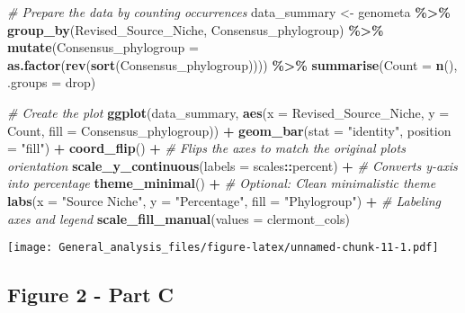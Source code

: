 \documentclass[
]{article}
\newenvironment{Shaded}{\begin{snugshade}}{\end{snugshade}}
\newcommand{\AttributeTok}[1]{\textcolor[rgb]{0.13,0.29,0.53}{#1}}
\newcommand{\CommentTok}[1]{\textcolor[rgb]{0.56,0.35,0.01}{\textit{#1}}}
\newcommand{\FunctionTok}[1]{\textcolor[rgb]{0.13,0.29,0.53}{\textbf{#1}}}
\newcommand{\NormalTok}[1]{#1}
\newcommand{\OtherTok}[1]{\textcolor[rgb]{0.56,0.35,0.01}{#1}}
\newcommand{\SpecialCharTok}[1]{\textcolor[rgb]{0.81,0.36,0.00}{\textbf{#1}}}
\newcommand{\StringTok}[1]{\textcolor[rgb]{0.31,0.60,0.02}{#1}}
\begin{document}
\begin{Shaded}
\begin{Highlighting}[]
\CommentTok{\# Prepare the data by counting occurrences}
\NormalTok{data\_summary }\OtherTok{\textless{}{-}}\NormalTok{ genometa }\SpecialCharTok{\%\textgreater{}\%}
  \FunctionTok{group\_by}\NormalTok{(Revised\_Source\_Niche, Consensus\_phylogroup) }\SpecialCharTok{\%\textgreater{}\%}
  \FunctionTok{mutate}\NormalTok{(}\AttributeTok{Consensus\_phylogroup =} \FunctionTok{as.factor}\NormalTok{(}\FunctionTok{rev}\NormalTok{(}\FunctionTok{sort}\NormalTok{(Consensus\_phylogroup)))) }\SpecialCharTok{\%\textgreater{}\%} 
  \FunctionTok{summarise}\NormalTok{(}\AttributeTok{Count =} \FunctionTok{n}\NormalTok{(), }\AttributeTok{.groups =} \StringTok{\textquotesingle{}drop\textquotesingle{}}\NormalTok{)}

\CommentTok{\# Create the plot}
\FunctionTok{ggplot}\NormalTok{(data\_summary, }\FunctionTok{aes}\NormalTok{(}\AttributeTok{x =}\NormalTok{ Revised\_Source\_Niche, }\AttributeTok{y =}\NormalTok{ Count, }\AttributeTok{fill =}\NormalTok{ Consensus\_phylogroup)) }\SpecialCharTok{+}
  \FunctionTok{geom\_bar}\NormalTok{(}\AttributeTok{stat =} \StringTok{"identity"}\NormalTok{, }\AttributeTok{position =} \StringTok{"fill"}\NormalTok{) }\SpecialCharTok{+}
  \FunctionTok{coord\_flip}\NormalTok{() }\SpecialCharTok{+}  \CommentTok{\# Flips the axes to match the original plot\textquotesingle{}s orientation}
  \FunctionTok{scale\_y\_continuous}\NormalTok{(}\AttributeTok{labels =}\NormalTok{ scales}\SpecialCharTok{::}\NormalTok{percent) }\SpecialCharTok{+}  \CommentTok{\# Converts y{-}axis into percentage}
  \FunctionTok{theme\_minimal}\NormalTok{() }\SpecialCharTok{+}  \CommentTok{\# Optional: Clean minimalistic theme}
  \FunctionTok{labs}\NormalTok{(}\AttributeTok{x =} \StringTok{"Source Niche"}\NormalTok{, }\AttributeTok{y =} \StringTok{"Percentage"}\NormalTok{, }\AttributeTok{fill =} \StringTok{"Phylogroup"}\NormalTok{) }\SpecialCharTok{+}  \CommentTok{\# Labeling axes and legend}
  \FunctionTok{scale\_fill\_manual}\NormalTok{(}\AttributeTok{values =}\NormalTok{ clermont\_cols)}
\end{Highlighting}
\end{Shaded}

\texttt{[image: General\_analysis\_files/figure-latex/unnamed-chunk-11-1.pdf]}

\hypertarget{figure-2---part-c}{%
\subsection{Figure 2 - Part C}\label{figure-2---part-c}}
\end{document}

